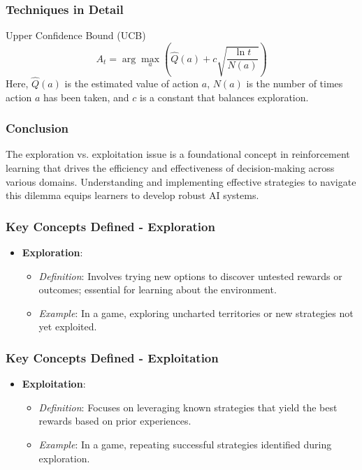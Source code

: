 \documentclass[aspectratio=169]{beamer}
\begin{document}
\begin{frame}[fragile]
    \frametitle{Techniques in Detail}

    \begin{block}{Upper Confidence Bound (UCB)}
        \begin{equation}
        A_t = \arg\max_{a} \left( \hat{Q}(a) + c \sqrt{\frac{\ln t}{N(a)}} \right)
        \end{equation}
        Here, \( \hat{Q}(a) \) is the estimated value of action \( a \), \( N(a) \) is the number of times action \( a \) has been taken, and \( c \) is a constant that balances exploration.
    \end{block}
\end{frame}

\begin{frame}[fragile]
    \frametitle{Conclusion}

    The exploration vs. exploitation issue is a foundational concept in reinforcement learning that drives the efficiency and effectiveness of decision-making across various domains. Understanding and implementing effective strategies to navigate this dilemma equips learners to develop robust AI systems.
\end{frame}

\begin{frame}[fragile]
    \frametitle{Key Concepts Defined - Exploration}
    \begin{itemize}
        \item \textbf{Exploration}:
        \begin{itemize}
            \item \textit{Definition}: Involves trying new options to discover untested rewards or outcomes; essential for learning about the environment.
            \item \textit{Example}: In a game, exploring uncharted territories or new strategies not yet exploited.
        \end{itemize}
    \end{itemize}
\end{frame}

\begin{frame}[fragile]
    \frametitle{Key Concepts Defined - Exploitation}
    \begin{itemize}
        \item \textbf{Exploitation}:
        \begin{itemize}
            \item \textit{Definition}: Focuses on leveraging known strategies that yield the best rewards based on prior experiences.
            \item \textit{Example}: In a game, repeating successful strategies identified during exploration.
        \end{itemize}
    \end{itemize}
\end{frame}
\end{document}
